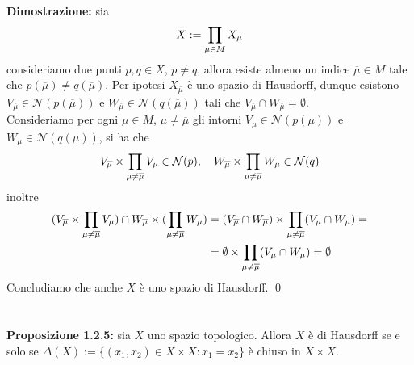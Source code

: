 \documentclass{article}
\begin{document}
\textbf{Dimostrazione:} sia
\begin{gather}
    X := \prod_{\mu \in M} X_\mu \notag
\end{gather}
consideriamo due punti $p, q \in X$, $p \neq q$, allora esiste almeno un indice $\overline{\mu} \in M$ tale che $p(\overline{\mu}) \neq q(\overline{\mu})$. Per ipotesi $X_{\overline{\mu}}$ è uno spazio di Hausdorff, dunque esistono $V_{\overline{\mu}} \in \mathcal{N}(p(\overline{\mu}))$ e $W_{\overline{\mu}} \in \mathcal{N}(q(\overline{\mu}))$ tali che $V_{\overline{\mu}} \cap W_{\overline{\mu}} = \emptyset$. \\
Consideriamo per ogni $\mu \in M$, $\mu \neq \overline{\mu}$ gli intorni $V_\mu \in \mathcal{N}(p(\mu))$ e $W_\mu \in \mathcal{N}(q(\mu))$, si ha che
\begin{gather}
    V_{\overline{\mu}} \times \prod_{\mu \neq \overline{\mu}} V_\mu \in \mathcal{N}(p), \quad W_{\overline{\mu}} \times \prod_{\mu \neq \overline{\mu}} W_\mu \in \mathcal{N}(q) \notag
\end{gather}
inoltre
\begin{align}
    (V_{\overline{\mu}} \times \prod_{\mu \neq \overline{\mu}} V_\mu) \cap W_{\overline{\mu}} \times (\prod_{\mu \neq \overline{\mu}} W_\mu) &= (V_{\overline{\mu}} \cap W_{\overline{\mu}}) \times \prod_{\mu \neq \overline{\mu}} (V_\mu \cap W_\mu) = \notag \\
    &= \emptyset \times \prod_{\mu \neq \overline{\mu}} (V_\mu \cap W_\mu) = \emptyset \notag
\end{align}
Concludiamo che anche $X$ è uno spazio di Hausdorff. \qed \\ \\ \\
\textbf{Proposizione 1.2.5:} sia $X$ uno spazio topologico. Allora $X$ è di Hausdorff se e solo se $\Delta(X) := \{ (x_1, x_2) \in X \times X : x_1 = x_2 \}$ è chiuso in $X \times X$. \\
\end{document}
